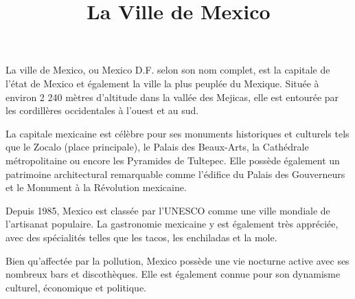 \documentclass[12pt, a4paper]{article}
\title{La Ville de Mexico}
\author{}
\date{}
\begin{document}
   \maketitle

   La ville de Mexico, ou Mexico D.F. selon son nom complet, est la capitale de l'état de Mexico et également la ville la plus peuplée du Mexique. Située à environ 2 240 mètres d'altitude dans la vallée des Mejicas, elle est entourée par les cordillères occidentales à l'ouest et au sud.

   La capitale mexicaine est célèbre pour ses monuments historiques et culturels tels que le Zocalo (place principale), le Palais des Beaux-Arts, la Cathédrale métropolitaine ou encore les Pyramides de Tultepec. Elle possède également un patrimoine architectural remarquable comme l'édifice du Palais des Gouverneurs et le Monument à la Révolution mexicaine.

   Depuis 1985, Mexico est classée par l'UNESCO comme une ville mondiale de l'artisanat populaire. La gastronomie mexicaine y est également très appréciée, avec des spécialités telles que les tacos, les enchiladas et la mole.

   Bien qu'affectée par la pollution, Mexico possède une vie nocturne active avec ses nombreux bars et discothèques. Elle est également connue pour son dynamisme culturel, économique et politique.

  
\end{document}

